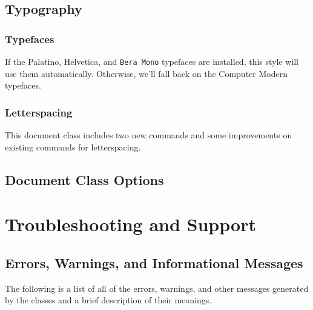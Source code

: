 \documentclass{tufte-book}
\begin{document}
\section{Typography}\label{sec:typography}

\subsection{Typefaces}\label{sec:typefaces}
If the Palatino, \textsf{Helvetica}, and \texttt{Bera Mono} typefaces are installed, this style
will use them automatically.  Otherwise, we'll fall back on the Computer Modern
typefaces.

\subsection{Letterspacing}\label{sec:letterspacing}
This document class includes two new commands and some improvements on
existing commands for letterspacing.

\section{Document Class Options}\label{sec:options}

\chapter{Troubleshooting and Support}
\label{ch:troubleshooting}

\section{Errors, Warnings, and Informational Messages}\label{sec:tl-messages}
The following is a list of all of the errors, warnings, and other messages generated by the classes and a brief description of their meanings.

\backmatter



\end{document}
